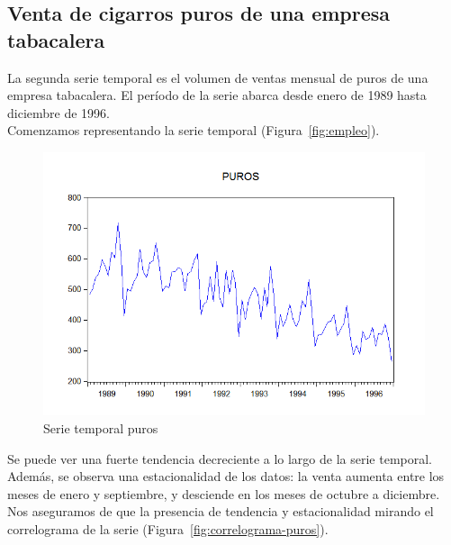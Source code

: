 \documentclass[12pt,a4paper,twoside,openright,titlepage,final]{article}
\begin{document}
\clearpage

\subsection{Venta de cigarros puros de una empresa tabacalera}

La segunda serie temporal es el volumen de ventas mensual de puros de una empresa tabacalera. El período de la serie abarca desde enero de 1989 hasta diciembre de 1996.\\

Comenzamos representando la serie temporal (Figura~\ref{fig:empleo}).\\

\begin{figure}[tbph!]
	\centering
	\includegraphics[width=0.8\linewidth]{imagenes/puros/puros.png}
	\caption{Serie temporal puros}
	\label{fig:puros}
\end{figure} 

Se puede ver una fuerte tendencia decreciente a lo largo de la serie temporal. Además, se observa una estacionalidad de los datos: la venta aumenta entre los meses de enero y septiembre, y desciende en los meses de octubre a diciembre.\\

Nos aseguramos de que la presencia de tendencia y estacionalidad mirando el correlograma de la serie (Figura~\ref{fig:correlograma-puros}).\\
\end{document}
